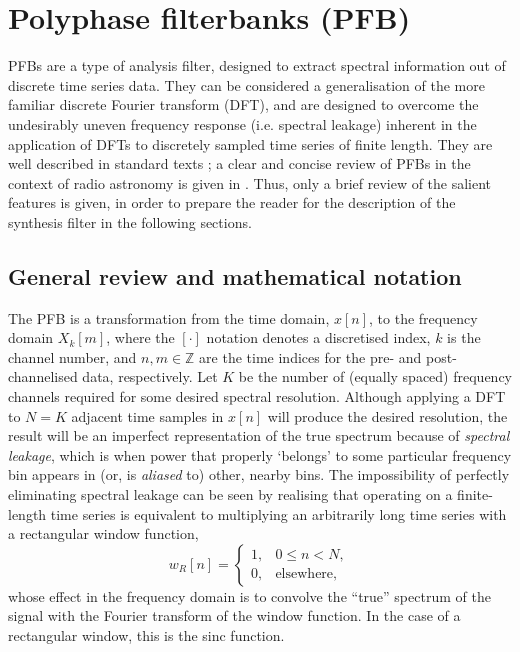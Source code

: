 \documentclass{pasa}%
\begin{document}
\section{Polyphase filterbanks (PFB)}
\label{sec:pfb}

PFBs are a type of analysis filter, designed to extract spectral information out of discrete time series data.
They can be considered a generalisation of the more familiar discrete Fourier transform (DFT), and are designed to overcome the undesirably uneven frequency response (i.e. spectral leakage) inherent in the application of DFTs to discretely sampled time series of finite length.
They are well described in standard texts \citep{Crochiere1983,Harris2004,Oppenheim2009}; a clear and concise review of PFBs in the context of radio astronomy is given in \citet{Harris2011}.
Thus, only a brief review of the salient features is given, in order to prepare the reader for the description of the synthesis filter in the following sections.

\subsection{General review and mathematical notation}

The PFB is a transformation from the time domain, $x[n]$, to the frequency domain $X_k[m]$, where the $[\cdot]$ notation denotes a discretised index, $k$ is the channel number, and $n,m \in \mathbb{Z}$ are the time indices for the pre- and post-channelised data, respectively.
Let $K$ be the number of (equally spaced) frequency channels required for some desired spectral resolution.
Although applying a DFT to $N = K$ adjacent time samples in $x[n]$ will produce the desired resolution, the result will be an imperfect representation of the true spectrum because of \textit{spectral leakage}, which is when power that properly `belongs' to some particular frequency bin appears in (or, is \textit{aliased} to) other, nearby bins.
The impossibility of perfectly eliminating spectral leakage can be seen by realising that operating on a finite-length time series is equivalent to multiplying an arbitrarily long time series with a rectangular window function,
\begin{equation}
    w_R[n] = \begin{cases} 1, & 0 \le n < N, \\ 0, & \text{elsewhere}, \end{cases}
\end{equation}
whose effect in the frequency domain is to convolve the ``true'' spectrum of the signal with the Fourier transform of the window function.
In the case of a rectangular window, this is the sinc function.
\end{document}

